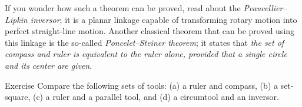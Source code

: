 If you wonder how such a theorem can be proved, read about the \textit{Peaucellier--Lipkin inversor};
it is a planar linkage capable of transforming rotary motion into perfect straight-line motion.
Another classical theorem that can be proved using this linkage is the so-called {}\emph{Poncelet--Steiner theorem};
it states that \textit{the set of compass and ruler is equivalent to the ruler alone, provided that a single circle and its center are given}.

\begin{thm}{Exercise}\label{ex:comparison}
Compare the following sets of tools:
(a) a ruler and compass, 
(b) a set-square, 
(c) a ruler and a parallel tool,
and
(d) a circumtool and an inversor.
\end{thm}


